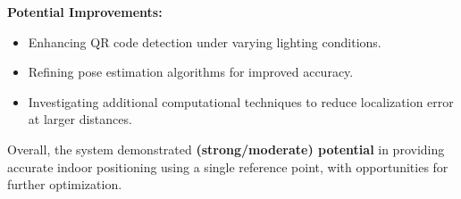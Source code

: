 \textbf{Potential Improvements:}
\begin{itemize}
	\item Enhancing QR code detection under varying lighting conditions.
	\item Refining pose estimation algorithms for improved accuracy.
	\item Investigating additional computational techniques to reduce localization error at larger distances.
\end{itemize}

Overall, the system demonstrated \textbf{(strong/moderate) potential} in providing accurate indoor positioning using a single reference point, with opportunities for further optimization.






